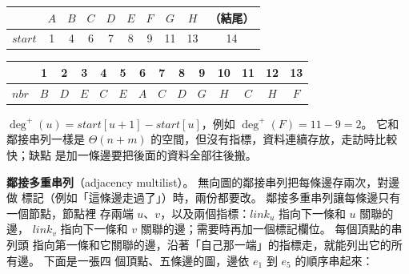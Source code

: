 \begin{center}
\begin{tabular}{l|ccccccccc}
 & $A$ & $B$ & $C$ & $D$ & $E$ & $F$ & $G$ & $H$ & （結尾）\\
\hline
$\mathit{start}$ & 1 & 4 & 6 & 7 & 8 & 9 & 11 & 13 & 14 \\
\end{tabular}

\smallskip
\begin{tabular}{l|ccccccccccccc}
 & 1 & 2 & 3 & 4 & 5 & 6 & 7 & 8 & 9 & 10 & 11 & 12 & 13 \\
\hline
$\mathit{nbr}$ & $B$ & $D$ & $E$ & $C$ & $E$ & $A$ & $C$ & $D$ & $G$ & $H$ & $C$ & $H$ & $F$ \\
\end{tabular}
\end{center}

$\deg^{+}(u) = \mathit{start}[u+1] - \mathit{start}[u]$，例如 $\deg^{+}(F) = 11 - 9 = 2$。
它和鄰接串列一樣是 $\Theta(n + m)$ 的空間，但沒有指標，資料連續存放，走訪時比較快；缺點
是加一條邊要把後面的資料全部往後搬。

\textbf{鄰接多重串列}（adjacency multilist）。 無向圖的鄰接串列把每條邊存兩次，對邊做
標記（例如「這條邊走過了」）時，兩份都要改。 鄰接多重串列讓每條邊只有一個節點，節點裡
存兩端 $u$、$v$，以及兩個指標：$\mathit{link}_u$ 指向下一條和 $u$ 關聯的邊，
$\mathit{link}_v$ 指向下一條和 $v$ 關聯的邊；需要時再加一個標記欄位。 每個頂點的串列頭
指向第一條和它關聯的邊，沿著「自己那一端」的指標走，就能列出它的所有邊。 下面是一張四
個頂點、五條邊的圖，邊依 $e_1$ 到 $e_5$ 的順序串起來：

